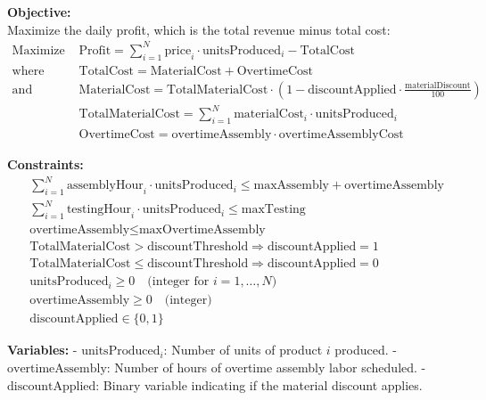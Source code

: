 \documentclass{article}
\begin{document}
\textbf{Objective:} \\
Maximize the daily profit, which is the total revenue minus total cost:
\begin{align*}
\text{Maximize } & \text{Profit} = \sum_{i=1}^{N} \text{price}_i \cdot \text{unitsProduced}_i - \text{TotalCost} \\
\text{where } & \text{TotalCost} = \text{MaterialCost} + \text{OvertimeCost} \\
\text{and } & \text{MaterialCost} = \text{TotalMaterialCost} \cdot (1 - \text{discountApplied} \cdot \frac{\text{materialDiscount}}{100}) \\
& \text{TotalMaterialCost} = \sum_{i=1}^{N} \text{materialCost}_i \cdot \text{unitsProduced}_i \\
& \text{OvertimeCost} = \text{overtimeAssembly} \cdot \text{overtimeAssemblyCost}
\end{align*}

\textbf{Constraints:}
\begin{align*}
& \sum_{i=1}^{N} \text{assemblyHour}_i \cdot \text{unitsProduced}_i \leq \text{maxAssembly} + \text{overtimeAssembly} \\
& \sum_{i=1}^{N} \text{testingHour}_i \cdot \text{unitsProduced}_i \leq \text{maxTesting} \\
& \text{overtimeAssembly} \leq \text{maxOvertimeAssembly} \\
& \text{TotalMaterialCost} > \text{discountThreshold} \Rightarrow \text{discountApplied} = 1 \\
& \text{TotalMaterialCost} \leq \text{discountThreshold} \Rightarrow \text{discountApplied} = 0 \\
& \text{unitsProduced}_i \geq 0 \quad \text{(integer for } i = 1, \ldots, N) \\
& \text{overtimeAssembly} \geq 0 \quad \text{(integer)} \\
& \text{discountApplied} \in \{0, 1\}
\end{align*}

\textbf{Variables:}
- \(\text{unitsProduced}_i\): Number of units of product \(i\) produced.
- \(\text{overtimeAssembly}\): Number of hours of overtime assembly labor scheduled.
- \(\text{discountApplied}\): Binary variable indicating if the material discount applies.
\end{document}
